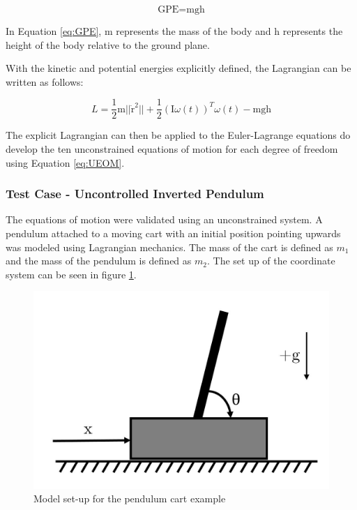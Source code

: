 \begin{equation}
\label{eq:GPE}
\text{GPE} = {\text{m}}{\text{g}}{\text{h}}
\end{equation}

In Equation \ref{eq:GPE}, m represents the mass of the body and h represents the height of the body relative to the ground plane.

With the kinetic and potential energies explicitly defined, the Lagrangian can be written as follows:

\begin{equation}
L= \frac{1}{2}{\text{m}}{\lvert \lvert {\dot{\text{r}}^2} \rvert \rvert} + \frac{1}{2}({\text{I}}{\omega(t)})^T\omega(t) - {\text{m}}{\text{g}}{\text{h}}
\end{equation}

The explicit Lagrangian can then be applied to the Euler-Lagrange equations do develop the ten unconstrained equations of motion for each degree of freedom using Equation \ref{eq:UEOM}.

\subsubsection{Test Case - Uncontrolled Inverted Pendulum}\label{sec:testcaseip}

The equations of motion were validated using an unconstrained system. A pendulum  attached to a moving cart with an initial position pointing upwards was modeled using Lagrangian mechanics. 
The mass of the cart is defined as $m_{1}$ and the mass of the pendulum is defined as $m_{2}$. 
The set up of the coordinate system can be seen in figure \ref{fig:pendulumcart}.

\begin{figure}[!htb]
	\centering
	\includegraphics[width=\linewidth]{pendulumcart}
	\caption{Model set-up for the pendulum cart example}\label{fig:pendulumcart}
	\endminipage
\end{figure} 

